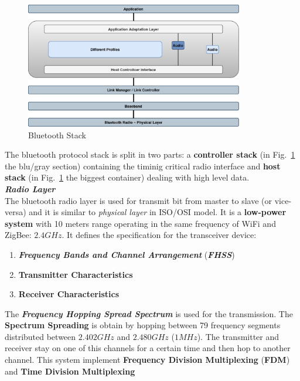\begin{figure}[h]
    \centering
    \includegraphics[width=0.85\textwidth]{img/ble_stack}
    \caption{Bluetooth Stack}
    \label{fig:ble_stack}
\end{figure}

The bluetooth protocol stack is split in two parts: a \textbf{controller stack} (in Fig.~\ref{fig:ble_stack} the blu/gray section) containing the timinig critical radio interface and \textbf{host stack} (in Fig.~\ref{fig:ble_stack} the biggest container) dealing with high level data. \\ \newline
\textbf{\textit{Radio Layer}} \\
The bluetooth radio layer is used for transmit bit from master to slave (or vice-versa) and it is similar to \textit{physical layer} in ISO/OSI model. It is a \textbf{low-power system} with 10 meters range operating in the same frequency of WiFi and ZigBee: $2.4GHz$. It defines the specification for the transceiver device:
\begin{enumerate}[nosep]
    \item \textbf{\textit{Frequency Bands and Channel Arrangement}} (\textbf{\textit{FHSS}})
    \item \textbf{Transmitter Characteristics}
    \item \textbf{Receiver Characteristics}
\end{enumerate}
The \textbf{\textit{Frequency Hopping Spread Spectrum}} is used for the transmission. The \textbf{Spectrum Spreading} is obtain by hopping between 79 frequency segments distributed between $2.402GHz$ and $2.480GHz$ ($1MHz$). The transmitter and receiver stay on one of this channels for a certain time and then hop to another channel. This system implement \textbf{Frequency Division Multiplexing} (\textbf{FDM}) and \textbf{Time Division Multiplexing}

